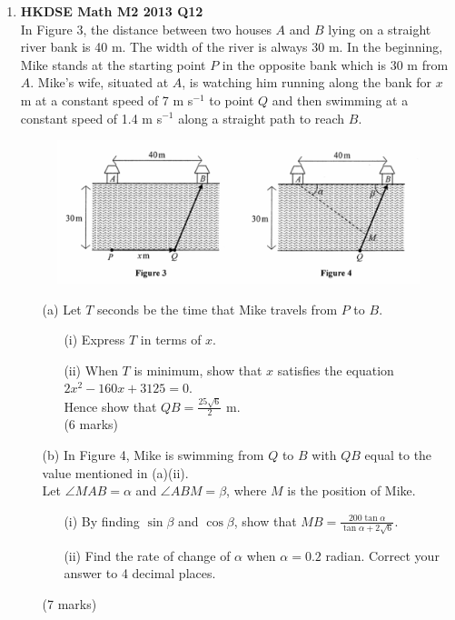 \documentclass[12pt]{article}
\begin{document}
\begin{enumerate}
	\item \textbf{HKDSE Math M2 2013 Q12}\\
	In Figure 3, the distance between two houses $A$ and $B$ lying on a straight river bank is 40 m. The width of the river is always 30 m. In the beginning, Mike stands at the starting point $P$ in the opposite bank which is 30 m from $A$. Mike's wife, situated at $A$, is watching him running along the bank for $x$ m at a constant speed of 7 m s$^{-1}$ to point $Q$ and then swimming at a constant speed of 1.4 m s$^{-1}$ along a straight path to reach $B$. 
	\begin{figure}[H]
		\centering
		\includegraphics[width = .5\linewidth]{2013Figure3n4}
	\end{figure}
	\begin{enumerate}
		\item [(a)]Let $T$ seconds be the time that Mike travels from $P$ to $B$. 
		\begin{enumerate}
			\item [(i)]Express $T$ in terms of $x$. 
			\item [(ii)]When $T$ is minimum, show that $x$ satisfies the equation $2x^2 -160x+3125 = 0$. \\
			Hence show that $QB = \displaystyle\frac{25\sqrt{6}}{2}$ m. \\(6 marks)
		\end{enumerate}
		\item [(b)]In Figure 4, Mike is swimming from $Q$ to $B$ with $QB$ equal to the value mentioned in (a)(ii).\\
		Let $\angle MAB = \alpha$ and $\angle ABM = \beta$, where $M$ is the position of Mike.
		\begin{enumerate}
			\item [(i)]By finding $\sin{\beta}$ and $\cos{\beta}$, show that $MB = \displaystyle\frac{200\tan{\alpha}}{\tan{\alpha} + 2\sqrt{6}}$. 
			\item [(ii)]Find the rate of change of $\alpha$ when $\alpha = 0.2$ radian. Correct your answer to 4 decimal places.
		\end{enumerate}
		(7 marks)
	\end{enumerate}



\end{enumerate}
\end{document}
